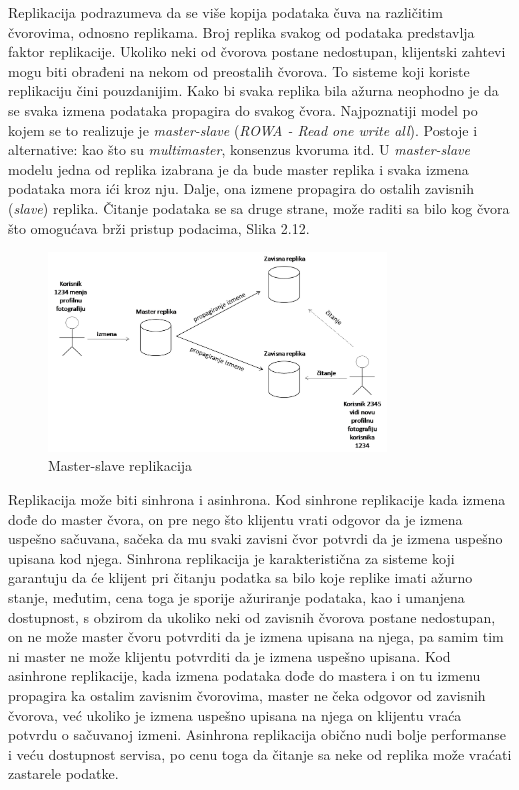 \documentclass[12pt,oneside]{memoir}
\begin{document}
Replikacija podrazumeva da se više kopija podataka čuva na različitim čvorovima, odnosno replikama. Broj replika svakog od podataka predstavlja faktor replikacije. Ukoliko neki od čvorova postane nedostupan, klijentski zahtevi mogu biti obrađeni na nekom od preostalih čvorova. To sisteme koji koriste replikaciju čini pouzdanijim. Kako bi svaka replika bila ažurna neophodno je da se svaka izmena podataka propagira do svakog čvora. Najpoznatiji model po kojem se to realizuje je \textit{master-slave} (\textit{ROWA - Read one write all}). Postoje i alternative: kao što su \textit{multimaster}, konsenzus kvoruma itd. U \textit{master-slave} modelu jedna od replika izabrana je da bude master replika i svaka izmena podataka mora ići kroz nju. Dalje, ona izmene propagira do ostalih zavisnih (\textit{slave}) replika. Čitanje podataka se sa druge strane, može 
raditi sa bilo kog čvora što omogućava brži pristup podacima, Slika 2.12.

\begin{figure}[!ht]
  \centering
  \includegraphics[width=0.8\textwidth]{master-slave.png}
  \caption{Master-slave replikacija}
  \label{fig:grafikon}
\end{figure}


Replikacija može biti sinhrona i asinhrona. Kod sinhrone replikacije kada izmena dođe do master čvora, on pre nego što klijentu vrati odgovor da je izmena uspešno sačuvana, sačeka da mu svaki zavisni čvor potvrdi da je izmena uspešno upisana kod njega. Sinhrona replikacija je karakteristična za sisteme koji garantuju da će klijent pri čitanju podatka sa bilo koje replike imati ažurno stanje, međutim, cena toga je sporije ažuriranje podataka, kao i umanjena dostupnost, s obzirom da ukoliko neki od zavisnih čvorova postane nedostupan, on ne može master čvoru potvrditi da je izmena upisana na njega, pa samim tim ni master ne može klijentu potvrditi da je izmena uspešno upisana. Kod asinhrone replikacije, kada izmena podataka dođe do mastera i on tu izmenu propagira ka ostalim zavisnim čvorovima, master ne čeka odgovor od zavisnih čvorova, već ukoliko je izmena uspešno upisana na njega on klijentu vraća potvrdu o sačuvanoj izmeni. Asinhrona replikacija obično nudi bolje performanse i veću dostupnost servisa, po cenu toga da čitanje sa neke od replika može vraćati zastarele podatke.
\end{document}

